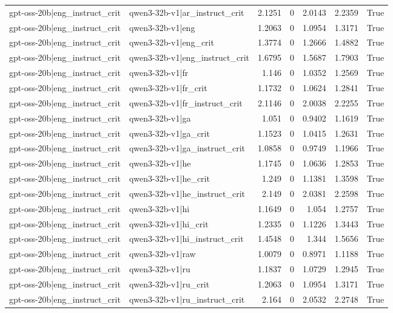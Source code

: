 \begin{table}
\begin{tabular}{l l r r r r l}
gpt-oss-20b|eng_instruct_crit & qwen3-32b-v1|ar_instruct_crit & 2.1251 & 0 & 2.0143 & 2.2359 & True \\
gpt-oss-20b|eng_instruct_crit & qwen3-32b-v1|eng & 1.2063 & 0 & 1.0954 & 1.3171 & True \\
gpt-oss-20b|eng_instruct_crit & qwen3-32b-v1|eng_crit & 1.3774 & 0 & 1.2666 & 1.4882 & True \\
gpt-oss-20b|eng_instruct_crit & qwen3-32b-v1|eng_instruct_crit & 1.6795 & 0 & 1.5687 & 1.7903 & True \\
gpt-oss-20b|eng_instruct_crit & qwen3-32b-v1|fr & 1.146 & 0 & 1.0352 & 1.2569 & True \\
gpt-oss-20b|eng_instruct_crit & qwen3-32b-v1|fr_crit & 1.1732 & 0 & 1.0624 & 1.2841 & True \\
gpt-oss-20b|eng_instruct_crit & qwen3-32b-v1|fr_instruct_crit & 2.1146 & 0 & 2.0038 & 2.2255 & True \\
gpt-oss-20b|eng_instruct_crit & qwen3-32b-v1|ga & 1.051 & 0 & 0.9402 & 1.1619 & True \\
gpt-oss-20b|eng_instruct_crit & qwen3-32b-v1|ga_crit & 1.1523 & 0 & 1.0415 & 1.2631 & True \\
gpt-oss-20b|eng_instruct_crit & qwen3-32b-v1|ga_instruct_crit & 1.0858 & 0 & 0.9749 & 1.1966 & True \\
gpt-oss-20b|eng_instruct_crit & qwen3-32b-v1|he & 1.1745 & 0 & 1.0636 & 1.2853 & True \\
gpt-oss-20b|eng_instruct_crit & qwen3-32b-v1|he_crit & 1.249 & 0 & 1.1381 & 1.3598 & True \\
gpt-oss-20b|eng_instruct_crit & qwen3-32b-v1|he_instruct_crit & 2.149 & 0 & 2.0381 & 2.2598 & True \\
gpt-oss-20b|eng_instruct_crit & qwen3-32b-v1|hi & 1.1649 & 0 & 1.054 & 1.2757 & True \\
gpt-oss-20b|eng_instruct_crit & qwen3-32b-v1|hi_crit & 1.2335 & 0 & 1.1226 & 1.3443 & True \\
gpt-oss-20b|eng_instruct_crit & qwen3-32b-v1|hi_instruct_crit & 1.4548 & 0 & 1.344 & 1.5656 & True \\
gpt-oss-20b|eng_instruct_crit & qwen3-32b-v1|raw & 1.0079 & 0 & 0.8971 & 1.1188 & True \\
gpt-oss-20b|eng_instruct_crit & qwen3-32b-v1|ru & 1.1837 & 0 & 1.0729 & 1.2945 & True \\
gpt-oss-20b|eng_instruct_crit & qwen3-32b-v1|ru_crit & 1.2063 & 0 & 1.0954 & 1.3171 & True \\
gpt-oss-20b|eng_instruct_crit & qwen3-32b-v1|ru_instruct_crit & 2.164 & 0 & 2.0532 & 2.2748 & True \\

\end{tabular}
\end{table}
